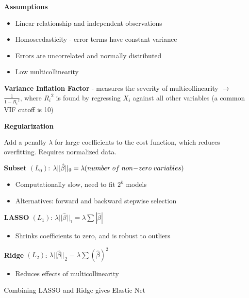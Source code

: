 \documentclass[10pt,landscape]{article}
\begin{document}
\begin{multicols}{3}
\textbf{Assumptions}
\begin{itemize}[label={--},leftmargin=4mm]
\vspace{-1mm}
\itemsep -.4mm
    \item Linear relationship and independent observations
    \item Homoscedasticity - error terms have constant variance
    \item Errors are uncorrelated and normally distributed
    \item Low multicollinearity
\end{itemize}

\textbf{Variance Inflation Factor} - measures the severity of multicollinearity $\to$ $\frac{1}{1-{R_i}^2}$, where ${R_i}^2$ is found by regressing $X_i$ against all other variables (a common VIF cutoff is 10)

\textbf{Regularization}

Add a penalty $\lambda$ for large coefficients to the cost function, which reduces overfitting. Requires normalized data.

\textbf{Subset}  $(L_0)$: $\lambda ||\hat{\beta}||_0 = \lambda (number \;of\;non\hspace{-.7mm}-\hspace{-.7mm}zero\; variables)$
\begin{itemize}[label={--},leftmargin=4mm]
\vspace{-1mm}
\itemsep -.4mm
\item Computationally slow, need to fit $2^k$ models
\item Alternatives: forward and backward stepwise selection
\end{itemize}
\textbf{LASSO} $(L_1)$: $\lambda ||\hat{\beta}||_1 = \lambda\sum | \hat{\beta} |$
\begin{itemize}[label={--},leftmargin=4mm]
\vspace{-1mm}
\itemsep -.4mm
\item Shrinks coefficients to zero, and is robust to outliers
\end{itemize}
\textbf{Ridge}  $(L_2)$: $\lambda ||\hat{\beta}||_2 = \lambda\sum( \hat{\beta})^2$
\begin{itemize}[label={--},leftmargin=4mm]
\vspace{-1mm}
\itemsep -.4mm
\item Reduces effects of multicollinearity
\end{itemize}
Combining LASSO and Ridge gives Elastic Net\\


\end{multicols}
\end{document}
